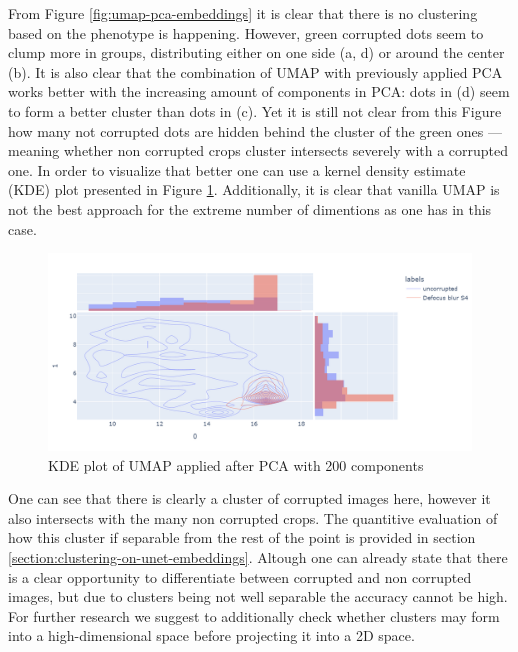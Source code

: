 From Figure \ref{fig:umap-pca-embeddings} it is clear that there is no clustering based on the phenotype is happening. However, green corrupted dots seem to clump more in groups, distributing either on one side (a, d) or around the center (b). It is also clear that the combination of UMAP with previously applied PCA works better with the increasing amount of components in PCA: dots in (d) seem to form a better cluster than dots in (c). Yet it is still not clear from this Figure how many not corrupted dots are hidden behind the cluster of the green ones --- meaning whether non corrupted crops cluster intersects severely with a corrupted one. In order to visualize that better one can use a kernel density estimate (KDE) plot presented in Figure \ref{fig:kde}. Additionally, it is clear that vanilla UMAP is not the best approach for the extreme number of dimentions as one has in this case.

\begin{figure}[htb]
	\begin{center}
		\includegraphics[width=0.6\linewidth]{bilder/unet-embeddings/kde.png}
	\caption{KDE plot of UMAP applied after PCA with 200 components}\label{fig:kde}
	\end{center}
\end{figure}

One can see that there is clearly a cluster of corrupted images here, however it also intersects with the many non corrupted crops. The quantitive evaluation of how this cluster if separable from the rest of the point is provided in section \ref{section:clustering-on-unet-embeddings}. Altough one can already state that there is a clear opportunity to differentiate between corrupted and non corrupted images, but due to clusters being not well separable the accuracy cannot be high. For further research we suggest to additionally check whether clusters may form into a high-dimensional space before projecting it into a 2D space. 
